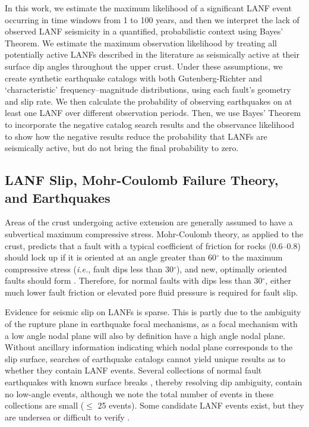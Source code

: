 \documentclass[draft,grl]{AGUTeX}
\begin{document}
\begin{article}
In this work, we estimate the maximum likelihood of a significant LANF event
occurring in time windows from 1 to 100 years, and then we interpret the lack
of observed LANF seismicity in a quantified, probabilistic context using
Bayes' Theorem. We estimate the maximum observation likelihood by treating
all potentially active LANFs described in the literature as seismically active
at their surface dip angles throughout the upper crust. Under these
assumptions, we create synthetic earthquake catalogs with both
Gutenberg-Richter and `characteristic' frequency--magnitude distributions,
using each fault's geometry and slip rate.  We then calculate the probability
of observing earthquakes on at least one LANF over different observation
periods. Then, we use Bayes' Theorem to incorporate the negative catalog search
results and the observance likelihood to show how the negative results reduce
the probability that LANFs are seismically active, but do not bring the final
probability to zero.


\subsection{LANF Slip, Mohr-Coulomb Failure Theory, and Earthquakes}

Areas of the crust undergoing active extension are generally assumed to have
a subvertical maximum compressive stress.  Mohr-Coulomb theory, as applied to
the crust, predicts that a fault with a typical coefficient of friction for
rocks (0.6--0.8) should lock up if it is oriented at an angle greater than
60$^\circ$ to the maximum compressive stress  ({\it i.e.}, fault dips less than
30$^\circ$), and new, optimally oriented faults should form \citep{sibson1985}.
Therefore, for normal faults with dips less than 30$^\circ$, either much lower
fault friction or elevated pore fluid pressure is required for fault slip.

Evidence for seismic slip on LANFs is sparse.  This is partly due to the
ambiguity of the rupture plane in earthquake focal mechanisms, as a focal
mechanism with a low angle nodal plane will also by definition have a high
angle nodal plane.  Without ancillary information indicating which nodal plane
corresponds to the slip surface, searches of earthquake catalogs cannot yield
unique results as to whether they contain LANF events. Several collections of
normal fault earthquakes with known surface breaks \citep{jackson1987,
collettinisibson2001}, thereby resolving dip ambiguity, contain no low-angle
events, although we note the total number of events in these collections are
small ($\le$ 25 events).  Some candidate LANF events exist, but they are
undersea \citep[e.g.,][]{abers2001} or difficult to verify \citep[e.g.,]
[]{doser1987ancash}.



\end{article}
\end{document}
